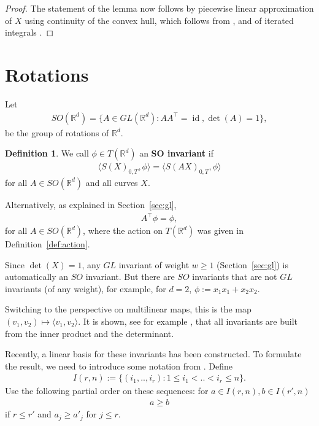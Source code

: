 \documentclass{scrartcl}
\theoremstyle{plain}
\theoremstyle{definition}
\newtheorem{definition}[theorem]{Definition}
\newcommand{\R}{\mathbb{R}}
\newcommand{\1}[1]{1_{\{#1\}}}
\newcommand{\ds}{d} %
\newcommand{\TS}{T(\R^\ds)} %
\begin{document}
\begin{proof}
  The statement of the lemma now follows by piecewise linear approximation of $X$
  using continuity of the convex hull, which follows from \cite[Lemma 3.2]{bib:EN2010},
  and of iterated integrals \cite[Proposition 1.28, Proposition 2.7]{bib:FV2010}.

\end{proof}




\section{Rotations}
\label{sec:so}

Let
\begin{align*}
  SO(\R^\ds) = \{ A \in GL(\R^\ds) : A A^\top = \operatorname{id}, \det( A ) = 1 \},
\end{align*}
be the group of rotations of $\R^\ds$.

\begin{definition}
  We call $\phi \in T(\R^\ds)$ an \textbf{SO invariant} if
  \begin{align*}
    \langle S(X)_{0,T}, \phi \rangle = \langle S(A X)_{0,T}, \phi \rangle
  \end{align*}
  for all $A \in SO(\R^\ds)$ and all curves $X$.

  Alternatively, as explained in Section~\ref{sec:gl},
  \begin{align*}
    A^\top \phi = \phi,
  \end{align*}
  for all $A \in SO(\R^\ds)$, where the action on $\TS$ was given in Definition~\ref{def:action}.
\end{definition}

Since $\det(X) = 1$, any $GL$ invariant of weight $w \ge 1$ (Section~\ref{sec:gl})
is automatically an $SO$ invariant. But there are $SO$ invariants that are not $GL$ invariants (of any weight),
for example, for $d=2$, $\phi := x_1 x_1 + x_2 x_2$.

Switching to the perspective on multilinear maps, this is the map $(v_1,v_2) \mapsto \langle v_1, v_2 \rangle$.
%
It is shown, see for example {\cite[Theorem 2.9.A]{bib:Wey1946}},
that all invariants are built from the inner product and the determinant.

Recently, a linear basis for these invariants has been constructed.
To formulate the result, we need to introduce some notation from \cite{bib:LK2007}.
%
Define %
\begin{align*}
  I(r,n) := \{( i_1, .., i_r ) : 1 \le i_1 < .. < i_r \le n \}.
\end{align*}
Use the following partial order on these sequences: for $a \in I(r,n), b \in I(r',n)$
\begin{align*}
  a \ge b
\end{align*}
if $r \le r'$ and $a_j \ge a'_j$ for $j \le r$.
\end{document}
